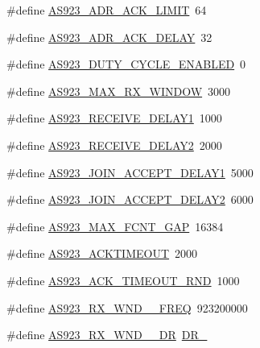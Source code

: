 \begin{DoxyCompactItemize}
\item 
\#define \mbox{\hyperlink{group___r_e_g_i_o_n_a_s923_ga83b8b9ab4bab852209f471da8518bf2d}{A\+S923\+\_\+\+A\+D\+R\+\_\+\+A\+C\+K\+\_\+\+L\+I\+M\+IT}}~64
\item 
\#define \mbox{\hyperlink{group___r_e_g_i_o_n_a_s923_ga77d7f3a0e26d3bfeded53fce115d5180}{A\+S923\+\_\+\+A\+D\+R\+\_\+\+A\+C\+K\+\_\+\+D\+E\+L\+AY}}~32
\item 
\#define \mbox{\hyperlink{group___r_e_g_i_o_n_a_s923_ga9a38122696d349e600de24f267340b93}{A\+S923\+\_\+\+D\+U\+T\+Y\+\_\+\+C\+Y\+C\+L\+E\+\_\+\+E\+N\+A\+B\+L\+ED}}~0
\item 
\#define \mbox{\hyperlink{group___r_e_g_i_o_n_a_s923_ga1da68477a3fef68cc666a41fb5362bc6}{A\+S923\+\_\+\+M\+A\+X\+\_\+\+R\+X\+\_\+\+W\+I\+N\+D\+OW}}~3000
\item 
\#define \mbox{\hyperlink{group___r_e_g_i_o_n_a_s923_gaa18d3ea411b8511078af8c0a07304999}{A\+S923\+\_\+\+R\+E\+C\+E\+I\+V\+E\+\_\+\+D\+E\+L\+A\+Y1}}~1000
\item 
\#define \mbox{\hyperlink{group___r_e_g_i_o_n_a_s923_ga37f081e957cc36c733b5008aa46b9511}{A\+S923\+\_\+\+R\+E\+C\+E\+I\+V\+E\+\_\+\+D\+E\+L\+A\+Y2}}~2000
\item 
\#define \mbox{\hyperlink{group___r_e_g_i_o_n_a_s923_gaa108eaacc8ee4c9a46b37327b3b2eea1}{A\+S923\+\_\+\+J\+O\+I\+N\+\_\+\+A\+C\+C\+E\+P\+T\+\_\+\+D\+E\+L\+A\+Y1}}~5000
\item 
\#define \mbox{\hyperlink{group___r_e_g_i_o_n_a_s923_gafd48180d34e9cb94a0747ea0a2dfff28}{A\+S923\+\_\+\+J\+O\+I\+N\+\_\+\+A\+C\+C\+E\+P\+T\+\_\+\+D\+E\+L\+A\+Y2}}~6000
\item 
\#define \mbox{\hyperlink{group___r_e_g_i_o_n_a_s923_ga996b3bad607207a4c54e5a2b253e5dfd}{A\+S923\+\_\+\+M\+A\+X\+\_\+\+F\+C\+N\+T\+\_\+\+G\+AP}}~16384
\item 
\#define \mbox{\hyperlink{group___r_e_g_i_o_n_a_s923_gad4cd8450319521a6db078659d7ee9f62}{A\+S923\+\_\+\+A\+C\+K\+T\+I\+M\+E\+O\+UT}}~2000
\item 
\#define \mbox{\hyperlink{group___r_e_g_i_o_n_a_s923_gae069e1d35da1a7303a5242bbada80740}{A\+S923\+\_\+\+A\+C\+K\+\_\+\+T\+I\+M\+E\+O\+U\+T\+\_\+\+R\+ND}}~1000
\item 
\#define \mbox{\hyperlink{group___r_e_g_i_o_n_a_s923_ga537225e8ec04b97e81b2434ed4015abc}{A\+S923\+\_\+\+R\+X\+\_\+\+W\+N\+D\+\_\+\_\+\+F\+R\+EQ}}~923200000
\item 
\#define \mbox{\hyperlink{group___r_e_g_i_o_n_a_s923_gab765338caef1a1babc2572d1ced03470}{A\+S923\+\_\+\+R\+X\+\_\+\+W\+N\+D\+\_\+\_\+\+DR}}~\mbox{\hyperlink{group___r_e_g_i_o_n_gad402daa928a8b3dea829315fab69de17}{D\+R\+\_}}

\end{DoxyCompactItemize}
